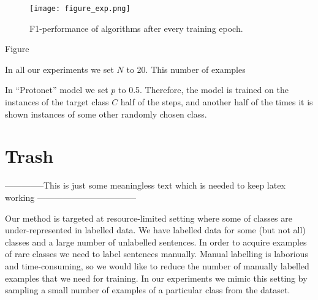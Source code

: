 \begin{figure*}
\texttt{[image: figure\_exp.png]} 
\caption{F1-performance of algorithms after every training epoch.}
\label{fig:}
\end{figure*}

Figure

In all our experiments we set $N$ to 20. This number of examples 

In ``Protonet'' model we set $p$ to 0.5. Therefore, the model is trained on the instances of the target class $C$ half of the steps, and another half of the times it is shown instances of some other randomly chosen class.


\section{Trash}





--------------This is just some meaningless text which is needed to keep latex working -----------------------------------

Our method is targeted at resource-limited setting where some of classes are under-represented in labelled data. We have labelled data for some (but not all) classes and a large number of unlabelled sentences. In order to acquire examples of rare classes we need to label sentences manually. Manual labelling is laborious and time-consuming, so we would like to reduce the number of manually labelled examples that we need for training. In our experiments we mimic this setting by sampling a small number of examples of a particular class from the dataset.



